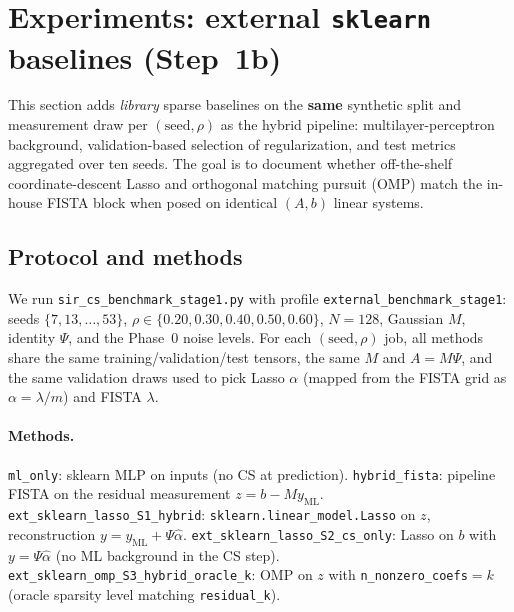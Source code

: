 
\section{Experiments: external \texttt{sklearn} baselines (Step~1b)}
\label{sec:exp_external_sklearn}

This section adds \emph{library} sparse baselines on the \textbf{same} synthetic split and measurement draw per $(\mathrm{seed},\rho)$ as the hybrid pipeline: multilayer-perceptron background, validation-based selection of regularization, and test metrics aggregated over ten seeds.
The goal is to document whether off-the-shelf coordinate-descent Lasso and orthogonal matching pursuit (OMP) match the in-house FISTA block when posed on identical $(A,b)$ linear systems.

\subsection{Protocol and methods}
\label{sec:external_protocol}

We run \texttt{sir\_cs\_benchmark\_stage1.py} with profile \texttt{external\_benchmark\_stage1}: seeds $\{7,13,\ldots,53\}$, $\rho\in\{0.20,0.30,0.40,0.50,0.60\}$, $N=128$, Gaussian $M$, identity $\Psi$, and the Phase~0 noise levels.
For each $(\mathrm{seed},\rho)$ job, all methods share the same training/validation/test tensors, the same $M$ and $A=M\Psi$, and the same validation draws used to pick Lasso $\alpha$ (mapped from the FISTA grid as $\alpha=\lambda/m$) and FISTA $\lambda$.

\paragraph{Methods.}
\texttt{ml\_only}: sklearn MLP on inputs (no CS at prediction).
\texttt{hybrid\_fista}: pipeline FISTA on the residual measurement $z=b-My_{\mathrm{ML}}$.
\texttt{ext\_sklearn\_lasso\_S1\_hybrid}: \texttt{sklearn.linear\_model.Lasso} on $z$, reconstruction $y=y_{\mathrm{ML}}+\Psi\hat\alpha$.
\texttt{ext\_sklearn\_lasso\_S2\_cs\_only}: Lasso on $b$ with $y=\Psi\hat\alpha$ (no ML background in the CS step).
\texttt{ext\_sklearn\_omp\_S3\_hybrid\_oracle\_k}: OMP on $z$ with \texttt{n\_nonzero\_coefs}${}=k$ (oracle sparsity level matching \texttt{residual\_k}).

